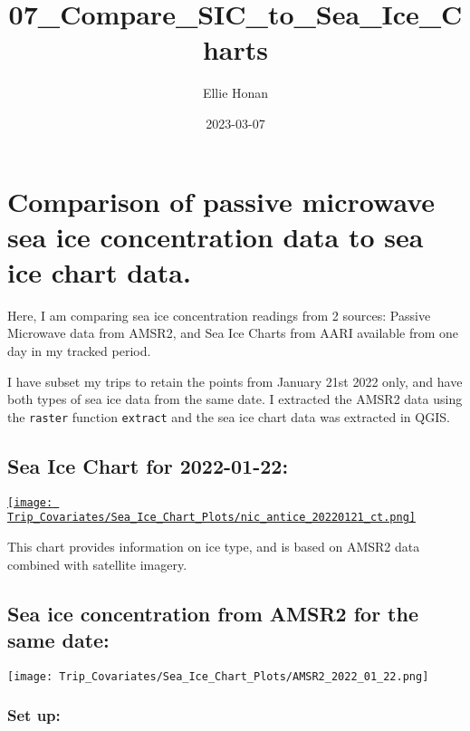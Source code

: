 \documentclass[
]{article}
\title{07\_Compare\_SIC\_to\_Sea\_Ice\_Charts}
\author{Ellie Honan}
\date{2023-03-07}
\begin{document}
\maketitle

\hypertarget{comparison-of-passive-microwave-sea-ice-concentration-data-to-sea-ice-chart-data.}{%
\section{Comparison of passive microwave sea ice concentration data to
sea ice chart
data.}\label{comparison-of-passive-microwave-sea-ice-concentration-data-to-sea-ice-chart-data.}}

Here, I am comparing sea ice concentration readings from 2 sources:
Passive Microwave data from AMSR2, and Sea Ice Charts from AARI
available from one day in my tracked period.

I have subset my trips to retain the points from January 21st 2022 only,
and have both types of sea ice data from the same date. I extracted the
AMSR2 data using the \texttt{raster} function \texttt{extract} and the
sea ice chart data was extracted in QGIS.

\hypertarget{sea-ice-chart-for-2022-01-22}{%
\subsection{Sea Ice Chart for
2022-01-22:}\label{sea-ice-chart-for-2022-01-22}}

\href{http://ice.aari.aq/antice/2022/01/20220121_nic/nic_antice_20220121_ct.png}{\texttt{[image: Trip\_Covariates/Sea\_Ice\_Chart\_Plots/nic\_antice\_20220121\_ct.png]}}

This chart provides information on ice type, and is based on AMSR2 data
combined with satellite imagery.

\hypertarget{sea-ice-concentration-from-amsr2-for-the-same-date}{%
\subsection{Sea ice concentration from AMSR2 for the same
date:}\label{sea-ice-concentration-from-amsr2-for-the-same-date}}

\texttt{[image: Trip\_Covariates/Sea\_Ice\_Chart\_Plots/AMSR2\_2022\_01\_22.png]}

\hypertarget{set-up}{%
\subsubsection{Set up:}\label{set-up}}
\end{document}
